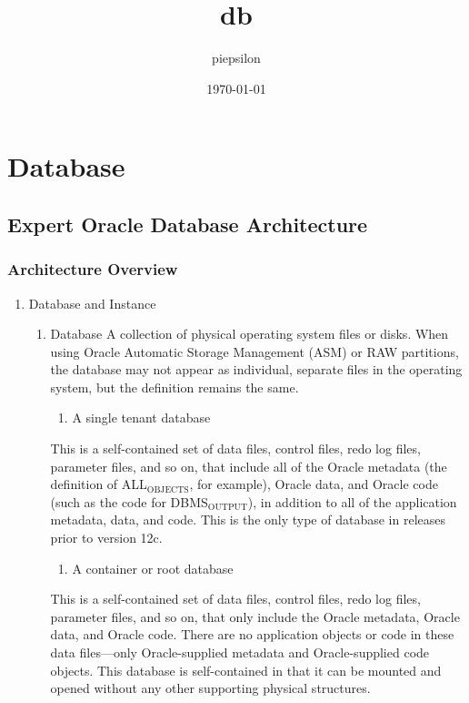 \documentclass[11pt]{article}
\author{piepsilon}
\date{\today}
\title{db}
\begin{document}
\maketitle
\tableofcontents

\section{Database}
\label{sec-1}
\subsection{Expert Oracle Database Architecture}
\label{sec-1-1}
\subsubsection{Architecture Overview}
\label{sec-1-1-1}
\begin{enumerate}
\item Database and Instance
\label{sec-1-1-1-1}
\begin{enumerate}
\item Database
\label{sec-1-1-1-1-1}
A collection of physical operating system files or disks. When using Oracle
Automatic Storage Management (ASM) or RAW partitions, the database may not
appear as individual, separate files in the operating system, but the 
definition remains the same.
\begin{enumerate}
\item A single tenant database
\end{enumerate}
This is a self-contained set of data files, control files, redo log files,
 parameter files, and so on, that include all of the Oracle metadata 
(the definition of ALL$_{\text{OBJECTS}}$, for example), Oracle data, and Oracle code 
(such as the code for DBMS$_{\text{OUTPUT}}$), in addition to all of the application 
metadata, data, and code. This is the only type of database in releases prior 
to version 12c.
\begin{enumerate}
\item A container or root database
\end{enumerate}
This is a self-contained set of data files, control files, redo log files, 
parameter files, and so on, that only include the Oracle metadata, Oracle data,
 and Oracle code. There are no application objects or code in these data 
files—only Oracle-supplied metadata and Oracle-supplied code objects. This 
database is self-contained in that it can be mounted and opened without any 
other supporting physical structures.

\end{enumerate}
\end{enumerate}
\end{document}
